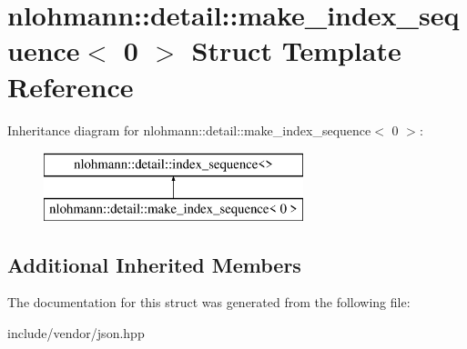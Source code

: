 \hypertarget{structnlohmann_1_1detail_1_1make__index__sequence_3_010_01_4}{}\section{nlohmann\+:\+:detail\+:\+:make\+\_\+index\+\_\+sequence$<$ 0 $>$ Struct Template Reference}
\label{structnlohmann_1_1detail_1_1make__index__sequence_3_010_01_4}
Inheritance diagram for nlohmann\+:\+:detail\+:\+:make\+\_\+index\+\_\+sequence$<$ 0 $>$\+:\begin{figure}[H]
\begin{center}
\leavevmode
\includegraphics[height=2.000000cm]{d9/d8f/structnlohmann_1_1detail_1_1make__index__sequence_3_010_01_4}
\end{center}
\end{figure}
\subsection*{Additional Inherited Members}


The documentation for this struct was generated from the following file\+:\begin{DoxyCompactItemize}
\item 
include/vendor/json.\+hpp\end{DoxyCompactItemize}
